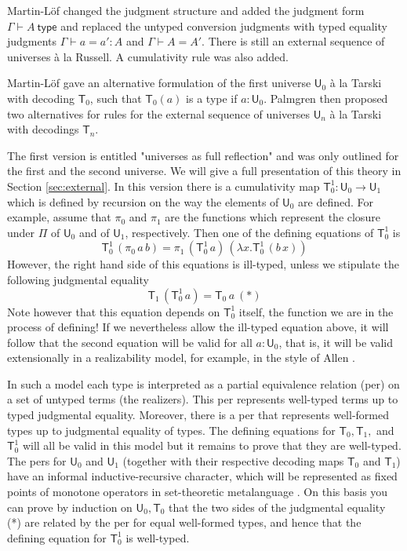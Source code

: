 \documentclass[11pt,a4paper]{article}
\def\UU{\mathsf{U}}
\newcommand{\type}{\mathsf{type}}
\newcommand{\T}{\mathsf{T}}
\begin{document}
Martin-Löf \cite{martinlof:hannover} changed the judgment structure and added the judgment form $\Gamma \vdash A\ \type$
and replaced the untyped conversion judgments with typed equality judgments $\Gamma \vdash a = a' : A$ and $\Gamma \vdash A = A'$. There is still an external sequence of universes \`a la Russell. A cumulativity rule was also added.

Martin-Löf \cite{martinlof:padova} gave an alternative formulation of the first universe $\UU_0$ \`a la Tarski with decoding $\T_0$, such that $\T_0(a)$ is a type if $a : \UU_0$. 
Palmgren \cite{palmgren:venice} then proposed two alternatives for rules for the external sequence of universes $\UU_n$ \`a la Tarski with decodings $\T_n$. 

The first version is entitled "universes as full reflection" and was only outlined for the first and the second universe. We will give a full presentation of this theory in Section \ref{sec:external}. In this version there is a cumulativity map $\T_0^1 : \UU_0 \to \UU_1$ which is defined by recursion on the way the elements of $\UU_0$ are defined. For example, assume that $\pi_0$ and $\pi_1$ are the functions which represent the closure under $\Pi$ of $\UU_0$ and of $\UU_1$, respectively. Then one of the defining equations of $\T_0^1$ is
$$
\T_0^1\, (\pi_0\,a\, b) = \pi_1\,(\T_0^1\,a)\,(\lambda x.\T_0^1\,(b\,x))
$$
However, the right hand side of this equations is ill-typed, unless we stipulate the following judgmental equality
$$
\T_1\, (\T_0^1\, a) = \T_0\, a\ (*)
$$
Note however that this equation depends on $\T_0^1$ itself, the function we are in the process of defining! If we nevertheless allow the ill-typed equation above, it will follow that the second equation will be valid for all $a : \UU_0$, that is, it will be valid extensionally in a realizability model, for example, in the style of Allen \cite{allen}. 

In such a model each type is interpreted as a partial equivalence relation (per) on a set of untyped terms (the realizers). This per represents well-typed terms up to typed judgmental equality. Moreover, there is a per that represents well-formed types up to judgmental equality of types. The defining equations for $\T_0, \T_1,$ and $\T_0^1$ will all be valid in this model but it remains to prove that they are well-typed. The pers for $\UU_0$ and $\UU_1$ (together with their respective decoding maps $\T_0$ and  $\T_1$) have an informal inductive-recursive character, which will be represented as fixed points of monotone operators in set-theoretic metalanguage \cite{allen}. On this basis you can prove by induction on $\UU_0, \T_0$ that the two sides of the judgmental equality (*) are related by the per for equal well-formed types, and hence that the defining equation for $\T_0^1$ is well-typed.
\end{document}
